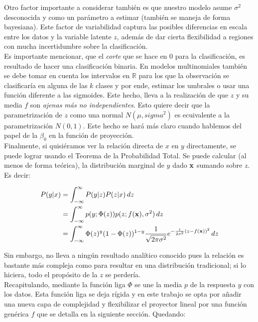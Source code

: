 \documentclass[../Main/Main.tex]{subfiles}
\begin{document}
Otro factor importante a considerar también es que nuestro modelo asume $\sigma^2$ desconocida y como un parámetro a estimar (también se maneja de forma bayesiana). Este factor de variabilidad captura las posibles diferencias en escala entre los datos y la variable latente $z$, además de dar cierta flexibilidad a regiones con mucha incertidumbre sobre la clasificación.\\ 

Es importante mencionar, que el \textit{corte} que se hace en 0 para la clasificación, es resultado de hacer una clasificación binaria. En modelos multinomiales también se debe tomar en cuenta los intervalos en $\mathbb{R}$ para los que la observación se clasificaría en alguna de las $k$ clases y por ende, estimar los umbrales o usar una función diferente a las sigmoides. Este hecho, lleva a la realización de que $z$ y su media $f$ son \textit{ajenas más no independientes}. Esto quiere decir que la parametrización de $z$ como una normal $N(\mu,sigma^2)$ es ecuivalente a la parametrización $N(0,1)$. Este hecho se hará más claro cuando hablemos del papel de la $\beta_0$ en la función de proyección. \\ 

Finalmente, si quisiéramos ver la relación directa de $x$ en $y$ directamente, se puede lograr usando el  Teorema de la Probabilidad Total. Se puede calcular (al menos de forma teórica), la distribución marginal de $y$ dado $\mathbf{x}$ sumando sobre $z$. Es decir:

\begin{align*}
P(y|x) 	&= \int_{-\infty}^\infty P(y|z)P(z|x)\, dz \\
		&= \int_{-\infty}^\infty p(y;\Phi(z))p(z;f(\mathbf{x}),\sigma^2)\, dz \\
		&= \int_{-\infty}^\infty \Phi(z)^y (1-\Phi(z))^{1-y}
		\dfrac{1}{\sqrt{2\pi\sigma^2}}e^{-\frac{1}{2\sigma^2}(z-f(\mathbf{x}))^2} \, dz
\end{align*}

Sin embargo, no lleva a ningún resultado analítico conocido pues la relación es bastante más compleja como para resultar en una distribución  tradicional; si lo hiciera, todo el propósito de la $z$ se perdería.\\

Recapitulando, mediante la función liga $\Phi$ se une la media $p$ de la respuesta $y$ con los datos. Esta función liga se deja rígida y en este trabajo se opta por añadir una nueva capa de complejidad y  flexibilizar el proyector lineal por una función genérica $f$ que se detalla en la siguiente sección. Quedando:
\end{document}
